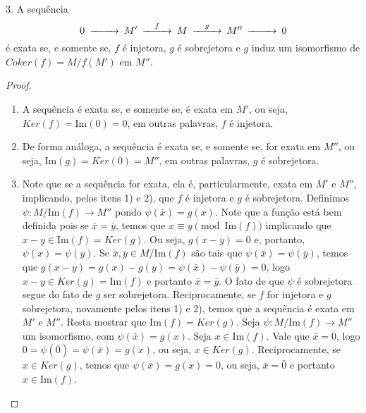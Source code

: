 \begin{proposition}
	3. A sequência
	\begin{equation*}
		\begin{CD}
			0@>{}>>M'@>{f}>>M@>{g}>>M''@>{}>>0
		\end{CD}
	\end{equation*}
	é exata  se, e somente se, $f$ é injetora, $g$ é sobrejetora e $g$ induz um isomorfismo de $Coker(f)=M/f(M')$ em $M''$.
	\begin{proof}
		$ $
		\begin{enumerate}
			\item A sequência é exata se, e somente se, é exata em $M'$, ou seja,  $Ker(f)=\mathrm{Im}(0)=0$, em outras palavras, $f$ é injetora.
			\item De forma análoga, a sequência é exata se, e somente se, for exata em $M''$, ou seja, $\mathrm{Im}(g)=Ker(0)=M''$, em outras palavras, $g$ é sobrejetora.
			\item Note que se a sequência for exata, ela é, particularmente, exata em $M'$ e $M''$, implicando, pelos itens 1) e 2), que $f$ é injetora e $g$ é sobrejetora. Definimos $\psi:M/\mathrm{Im}(f)\to M''$ pondo $\psi(\bar{x})=g(x)$. Note que a função está bem definida pois se $\bar{x}=\bar{y}$, temos que $x\equiv y \pmod{ \mathrm{Im}(f)}$ implicando que $x-y \in \mathrm{Im}(f)=Ker(g)$. Ou seja, $g(x-y)=0$ e, portanto, $\psi(x)=\psi(y)$. Se $\bar{x}, \bar{y} \in M/\mathrm{Im}(f)$ são tais que $\psi(\bar{x})=\psi(\bar{y})$, temos que $g(x-y)=g(x)-g(y)=\psi(\bar{x})-\psi(\bar{y})=0$, logo $x-y \in Ker(g)=\mathrm{Im}(f)$ e portanto $\bar{x}=\bar{y}$. O fato de que $\psi$ é sobrejetora segue do fato de $g$ ser sobrejetora.
			      Reciprocamente, se $f$ for injetora e $g$ sobrejetora, novamente pelos itens 1) e 2), temos que a sequência é exata em $M'$ e $M''$. Resta mostrar que $\mathrm{Im}(f)=Ker(g)$. Seja $\psi:M/\mathrm{Im}(f)\to M''$ um isomorfismo, com $\psi(\bar{x})=g(x)$. Seja $x \in \mathrm{Im}(f)$. Vale que $\bar{x}=\bar{0}$, logo $0=\psi(\bar{0})=\psi(\bar{x})=g(x)$, ou seja, $x \in Ker(g)$. Reciprocamente, se $x \in Ker(g)$, temos que $\psi(\bar{x})=g(x)=0$, ou seja, $\bar{x}=\bar{0}$ e portanto $x \in \mathrm{Im}(f)$.
		\end{enumerate}
	\end{proof}
\end{proposition}

